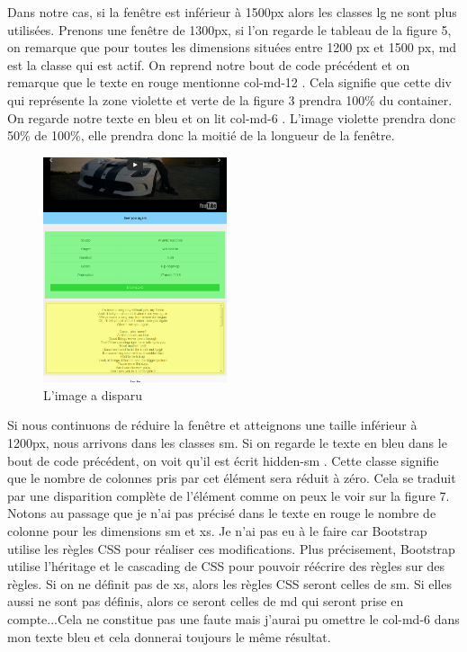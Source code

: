\documentclass{article}
\begin{document}
Dans notre cas, si la fen\^etre est inf\'erieur \`a 1500px alors les classes lg ne sont plus utilis\'ees. Prenons une fen\^etre de 1300px, si l'on regarde le tableau de la figure 5, on remarque que pour toutes les dimensions situ\'ees entre 1200 px et 1500 px, md est la classe qui est actif. On reprend notre bout de code pr\'ec\'edent et on remarque que le texte en rouge mentionne \og col-md-12 \fg{}. Cela signifie que cette div qui repr\'esente la zone violette et verte de la figure 3 prendra 100\% du container. On regarde notre texte en bleu et on lit \og col-md-6 \fg{}. L'image violette prendra donc 50\% de 100\%, elle prendra donc la moiti\'e de la longueur de la fen\^etre.\\

\newpage
\begin{figure}
  \vspace{-20pt}
  \begin{center}
    \includegraphics[width=0.48\textwidth]{p7}
  \end{center}
  \vspace{-20pt}
  \caption{L'image a disparu}
  \vspace{-10pt}
\end{figure} 

Si nous continuons de r\'eduire la fen\^etre et atteignons une taille inf\'erieur \`a 1200px, nous arrivons dans les classes sm. Si on regarde le texte en bleu dans le bout de code pr\'ec\'edent, on voit qu'il est \'ecrit \og hidden-sm \fg{}. Cette classe signifie que le nombre de colonnes pris par cet \'el\'ement sera r\'eduit \`a z\'ero. Cela se traduit par une disparition compl\`ete de l'\'el\'ement comme on peux le voir sur la figure 7. Notons au passage que je n'ai pas pr\'ecis\'e dans le texte en rouge le nombre de colonne pour les dimensions sm et xs. Je n'ai pas eu \`a le faire car Bootstrap utilise les r\`egles CSS pour r\'ealiser ces modifications. Plus pr\'ecisement, Bootstrap utilise l'h\'eritage et le cascading de CSS pour pouvoir r\'e\'ecrire des r\`egles sur des r\`egles. Si on ne d\'efinit pas de xs, alors les r\`egles CSS seront celles de sm. Si elles aussi ne sont pas d\'efinis, alors ce seront celles de md qui seront prise en compte...Cela ne constitue pas une faute mais j'aurai pu omettre le \og col-md-6 \fg{} dans mon texte bleu et cela donnerai toujours le m\^eme r\'esultat.\\
\end{document}
